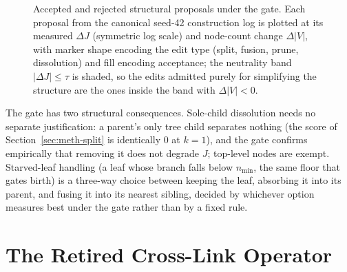 \begin{figure}[htbp]
\centering
{}
\caption{Accepted and rejected structural proposals under the gate.
Each proposal from the canonical seed-42 construction log is plotted
at its measured $\Delta J$ (symmetric log scale) and node-count change
$\Delta |V|$, with marker shape encoding the edit type (split, fusion,
prune, dissolution) and fill encoding acceptance; the neutrality band
$|\Delta J| \leq \tau$ is shaded, so the edits admitted purely for
simplifying the structure are the ones inside the band with
$\Delta |V| < 0$.}
\label{fig:proposal-gate-scatter}
\end{figure}

The gate has two structural consequences.
Sole-child dissolution needs no separate justification: a parent's
only tree child separates nothing (the score of
Section~\ref{sec:meth-split} is identically $0$ at $k = 1$), and the
gate confirms empirically that removing it does not degrade $J$;
top-level nodes are exempt.
Starved-leaf handling (a leaf whose branch falls below $n_{\min}$,
the same floor that gates birth) is a three-way choice between
keeping the leaf, absorbing it into its parent, and fusing it into its
nearest sibling, decided by whichever option measures best under the
gate rather than by a fixed rule.

\section{The Retired Cross-Link Operator}\label{app:cross-link-operator}

